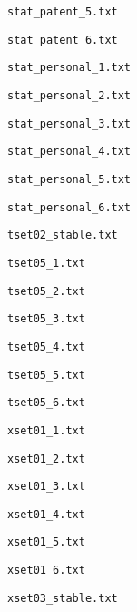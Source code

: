 \documentclass{article}
\begin{document}
\item \texttt{stat\_patent\_5.txt}
\item \texttt{stat\_patent\_6.txt}
\item \texttt{stat\_personal\_1.txt}
\item \texttt{stat\_personal\_2.txt}
\item \texttt{stat\_personal\_3.txt}
\item \texttt{stat\_personal\_4.txt}
\item \texttt{stat\_personal\_5.txt}
\item \texttt{stat\_personal\_6.txt}
\item \texttt{tset02\_stable.txt}
\item \texttt{tset05\_1.txt}
\item \texttt{tset05\_2.txt}
\item \texttt{tset05\_3.txt}
\item \texttt{tset05\_4.txt}
\item \texttt{tset05\_5.txt}
\item \texttt{tset05\_6.txt}
\item \texttt{xset01\_1.txt}
\item \texttt{xset01\_2.txt}
\item \texttt{xset01\_3.txt}
\item \texttt{xset01\_4.txt}
\item \texttt{xset01\_5.txt}
\item \texttt{xset01\_6.txt}
\item \texttt{xset03\_stable.txt}
\end{document}
